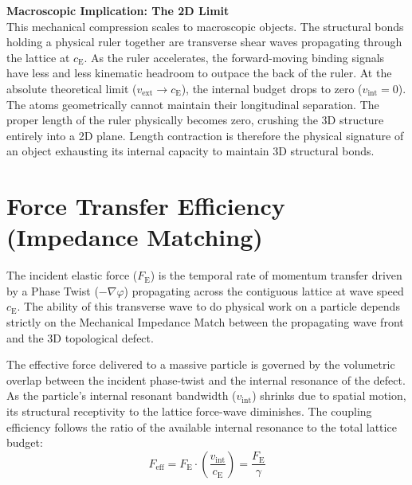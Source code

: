 \vspace{0.5em}
\noindent\textbf{Macroscopic Implication: The 2D Limit}\\
This mechanical compression scales to macroscopic objects. The structural bonds holding a physical ruler together are transverse shear waves propagating through the lattice at $c_{\mathrm{E}}$. As the ruler accelerates, the forward-moving binding signals have less and less kinematic headroom to outpace the back of the ruler. At the absolute theoretical limit ($v_{\mathrm{ext}} \to c_{\mathrm{E}}$), the internal budget drops to zero ($v_{\mathrm{int}} = 0$). The atoms geometrically cannot maintain their longitudinal separation. The proper length of the ruler physically becomes zero, crushing the 3D structure entirely into a 2D plane. Length contraction is therefore the physical signature of an object exhausting its internal capacity to maintain 3D structural bonds.

\section{Force Transfer Efficiency (Impedance Matching)}
\label{sec:force_effeciency}

The incident elastic force ($F_{\mathrm{E}}$) is the temporal rate of momentum transfer driven by a Phase Twist ($-\nabla\varphi$) propagating across the contiguous lattice at wave speed $c_{\mathrm{E}}$. The ability of this transverse wave to do physical work on a particle depends strictly on the Mechanical Impedance Match between the propagating wave front and the 3D topological defect.

The effective force delivered to a massive particle is governed by the volumetric overlap between the incident phase-twist and the internal resonance of the defect. As the particle's internal resonant bandwidth ($v_{\mathrm{int}}$) shrinks due to spatial motion, its structural receptivity to the lattice force-wave diminishes. The coupling efficiency follows the ratio of the available internal resonance to the total lattice budget:
\begin{equation}
    F_{\mathrm{eff}} = F_{\mathrm{E}} \cdot \left(\frac{v_{\mathrm{int}}}{c_{\mathrm{E}}}\right) = \frac{F_{\mathrm{E}}}{\gamma}
\end{equation}

